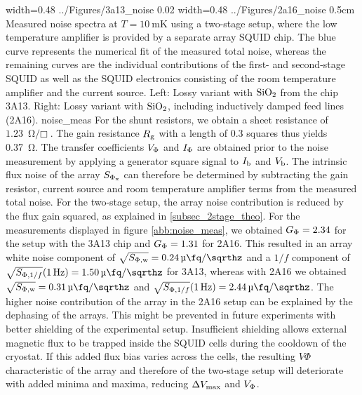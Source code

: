{width=0.48\textwidth}
{../Figures/3a13_noise}
{0.02\textwidth} %
{width=0.48\textwidth}
{../Figures/2a16_noise}
{0.5cm} %
{Measured noise spectra at $T=\qty{10}{\milli\kelvin}$ using a two-stage setup, where the low temperature amplifier is provided by a separate array SQUID chip. The blue curve represents the numerical fit of the measured total noise, whereas the remaining curves are the individual contributions of the first- and second-stage SQUID as well as the SQUID electronics consisting of the room temperature amplifier and the current source. Left: Lossy variant with ${\rm SiO_2}$ from the chip 3A13. Right: Lossy variant with ${\rm SiO_2}$, including inductively damped feed lines (2A16).}
{noise_meas}
For the shunt resistors, we obtain a sheet resistance of $\qty{1.23}{\ohm\per\Box}$. The gain resistance $R_{\rm g}$ with a length of 0.3 squares thus yields \qty{0.37}{\ohm}. The transfer coefficients $V_{\rm \Phi}$ and $I_{\rm \Phi}$ are obtained prior to the noise measurement by applying a generator square signal to $I_{\rm b}$ and $V_{\rm b}$. The intrinsic flux noise of the array $S_{\rm \Phi_x}$ can therefore be determined by subtracting the gain resistor, current source and room temperature amplifier terms from the measured total noise. For the two-stage setup, the array noise contribution is reduced by the flux gain squared, as explained in \ref{subsec_2stage_theo}. For the measurements displayed in figure \ref{abb:noise_meas}, we obtained $G_{\rm \Phi}=2.34$ for the setup with the 3A13 chip and $G_{\rm \Phi}=1.31$ for 2A16. This resulted in an array white noise component of $\sqrt{S_{\rm \Phi,w}}=\qty{0.24}{\micro\fq\per\sqrthz}$ and a $1/f$ component of $\sqrt{S_{{\rm \Phi},1/f}}(\qty{1}{\Hz})=\qty{1.50}{\micro\fq\per\sqrthz}$ for 3A13, whereas with 2A16 we obtained $\sqrt{S_{\rm \Phi,w}}=\qty{0.31}{\micro\fq\per\sqrthz}$ and $\sqrt{S_{{\rm \Phi},1/f}}(\qty{1}{\Hz})=\qty{2.44}{\micro\fq\per\sqrthz}$. The higher noise contribution of the array in the 2A16 setup can be explained by the dephasing of the arrays. This might be prevented in future experiments with better shielding of the experimental setup. Insufficient shielding allows external magnetic flux to be trapped inside the SQUID cells during the cooldown of the cryostat. If this added flux bias varies across the cells, the resulting $V\Phi$ characteristic of the array and therefore of the two-stage setup will deteriorate with added minima and maxima, reducing $\Delta V_{\rm max}$ and $V_{\rm \Phi}$. \\

